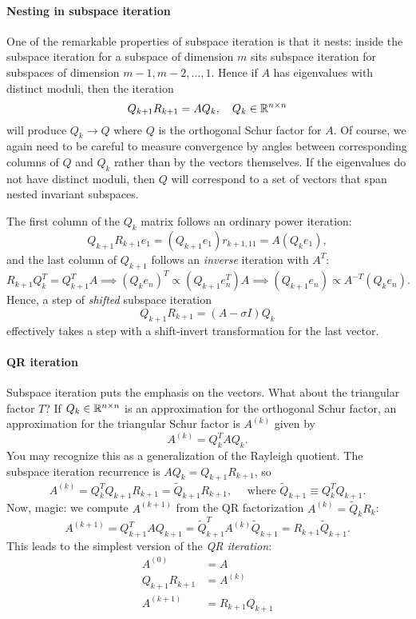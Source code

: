 \documentclass[12pt, leqno]{article}
\begin{document}
\paragraph{Nesting in subspace iteration}
One of the remarkable properties of subspace iteration is that it
nests: inside the subspace iteration for a subspace of dimension $m$
sits subspace iteration for subspaces of dimension $m-1, m-2, \ldots, 1$.
Hence if $A$ has eigenvalues with distinct moduli, then the iteration
\[
  Q_{k+1} R_{k+1} = A Q_k, \quad Q_k \in \mathbb{R}^{n \times n}
\]
will produce $Q_k \rightarrow Q$ where $Q$ is the orthogonal Schur
factor for $A$.  Of course, we again need to be careful to measure
convergence by angles between corresponding columns of $Q$ and $Q_k$
rather than by the vectors themselves.  If the eigenvalues do not
have distinct moduli, then $Q$ will correspond to a set of vectors
that span nested invariant subspaces.

The first column of the $Q_k$ matrix follows an ordinary power iteration:
\[
  Q_{k+1} R_{k+1} e_1 = (Q_{k+1} e_1) r_{k+1,11} = A (Q_k e_1),
\]
and the last column of $Q_{k+1}$ follows an {\em inverse} iteration
with $A^T$:
\[
  R_{k+1} Q_k^T = Q_{k+1}^T A \implies
  (Q_k e_n)^T \propto (Q_{k+1} e_n^T) A \implies
  (Q_{k+1} e_n) \propto A^{-T} (Q_k e_n).
\]
Hence, a step of {\em shifted} subspace iteration
\[
  Q_{k+1} R_{k+1} = (A-\sigma I) Q_k
\]
effectively takes a step with a shift-invert transformation for
the last vector.

\paragraph{QR iteration}
Subspace iteration puts the emphasis on the vectors.  What about the
triangular factor $T$?  If $Q_k \in \mathbb{R}^{n \times n}$ is an
approximation for the orthogonal Schur factor, an approximation for
the triangular Schur factor is $A^{(k)}$ given by
\[
  A^{(k)} = Q_k^T A Q_k.
\]
You may recognize this as a generalization of the Rayleigh quotient.
The subspace iteration recurrence is $A Q_k = Q_{k+1} R_{k+1}$, so
\[
  A^{(k)} = Q_k^T Q_{k+1} R_{k+1} = \tilde{Q}_{k+1} R_{k+1}, \quad
  \mbox{ where } \tilde{Q}_{k+1} \equiv Q_k^T Q_{k+1}.
\]
Now, magic: we compute $A^{(k+1)}$ from
the QR factorization $A^{(k)} = \tilde{Q}_k R_k$:
\[
  A^{(k+1)} = Q_{k+1}^T A Q_{k+1}
    = \tilde{Q}_{k+1}^T A^{(k)} \tilde{Q}_{k+1}
    = R_{k+1} \tilde{Q}_{k+1}.
\]
This leads to the simplest version of the {\em QR iteration}:
\begin{align*}
  A^{(0)} &= A \\
  Q_{k+1} R_{k+1} &= A^{(k)} \\
  A^{(k+1)} &= R_{k+1} Q_{k+1}
\end{align*}
\end{document}
